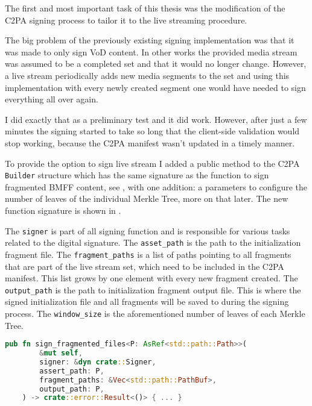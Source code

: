 The first and most important task of this thesis was the modification of the C2PA signing process to tailor it to the live streaming procedure.

The big problem of the previously existing signing implementation was that it was made to only sign VoD content. In other works the provided media stream was assumed to be a completed set and that it would no longer change. However, a live stream periodically adds new media segments to the set and using this implementation with every newly created segment one would have needed to sign everything all over again.

I did exactly that as a preliminary test and it did work. However, after just a few minutes the signing started to take so long that the client-side validation would stop working, because the C2PA manifest wasn't updated in a timely manner.

To provide the option to sign live stream I added a public method to the C2PA \texttt{Builder} structure which has the same signature as the function to sign fragmented BMFF content, see , with one addition: a parameters to configure the number of leaves of the individual Merkle Tree, more on that later. The new function signature is shown in .

The \texttt{signer} is part of all signing function and is responsible for various tasks related to the digital signature. The \texttt{asset\_path} is the path to the initialization fragment file. The \texttt{fragment\_paths} is a list of paths pointing to all fragments that are part of the live stream set, which need to be included in the C2PA manifest. This list grows by one element with every new fragment created. The \texttt{output\_path} is the path to initialization fragment output file. This is where the signed initialization file and all fragments will be saved to during the signing process. The \texttt{window\_size} is the aforementioned number of leaves of each Merkle Tree. 

\begin{minipage}{\linewidth}
\begin{lstlisting}[caption={Original Signing Function}, label=code:fragment_bmff, language=Rust, captionpos=b]
    pub fn sign_fragmented_files<P: AsRef<std::path::Path>>(
        &mut self,
        signer: &dyn crate::Signer,
        assert_path: P,
        fragment_paths: &Vec<std::path::PathBuf>,
        output_path: P,
    ) -> crate::error::Result<()> { ... }
\end{lstlisting}
\end{minipage}

